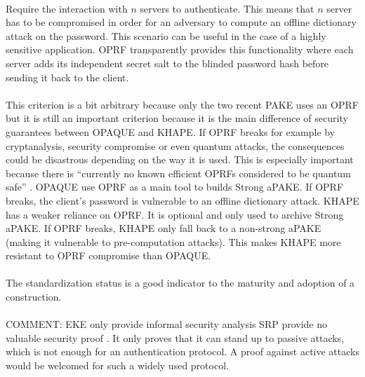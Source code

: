 ﻿\documentclass[../report.tex]{subfiles}
\begin{document}
\paragraph{}
Require the interaction with $n$ servers to authenticate. This means that $n$ server has to be compromised in order for an adversary to compute an offline dictionary attack on the password. This scenario can be useful in the case of a highly sensitive application.
OPRF transparently provides this functionality where each server adds its independent secret salt to the blinded password hash before sending it back to the client.
\paragraph{}
This criterion is a bit arbitrary because only the two recent PAKE uses an OPRF but it is still an important criterion because it is the main difference of security guarantees between OPAQUE and KHAPE.
If OPRF breaks for example by cryptanalysis, security compromise or even quantum attacks, the consequences could be disastrous depending on the way it is used. This is especially important because there is ``currently no known efficient OPRFs considered to be quantum safe'' \cite{KHAPE_Paper}.
OPAQUE use OPRF as a main tool to builds Strong aPAKE. If OPRF breaks, the client's password is vulnerable to an offline dictionary attack.
KHAPE has a weaker reliance on OPRF. It is optional and only used to archive Strong aPAKE. If OPRF breaks, KHAPE only fall back to a non-strong aPAKE (making it vulnerable to pre-computation attacks). 
This makes KHAPE more resistant to OPRF compromise than OPAQUE. 

\paragraph{}
The standardization status is a good indicator to the maturity and adoption of a construction.
\paragraph{}
COMMENT: EKE only provide informal security analysis \cite{EKE_Informal_Security_Analysis}
SRP provide no valuable security proof \cite{CAA, SRP_Green_blog}. It only proves that it can stand up to passive attacks, which is not enough for an authentication protocol. A proof against active attacks would be welcomed for such a widely used protocol.
\end{document}
